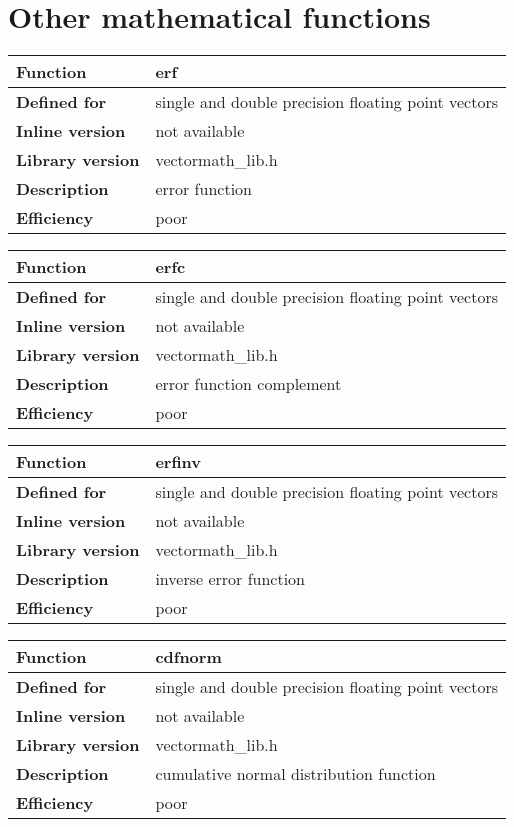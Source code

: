 \documentclass[vcl_manual.tex]{subfiles}
\begin{document}
\section{Other mathematical functions}\label{OtherMathematicalFunctions}

\begin{tabular}{|p{30mm}|p{120mm}|}
\hline
\bfseries Function & erf \\ \hline
\bfseries Defined for & single and double precision floating point vectors \\ \hline
\bfseries Inline version & not available \\ \hline
\bfseries Library version & vectormath\_lib.h \\ \hline
\bfseries Description & error function \\ \hline
\bfseries Efficiency & poor \\ \hline
\end{tabular}


\begin{tabular}{|p{30mm}|p{120mm}|}
\hline
\bfseries Function & erfc \\ \hline
\bfseries Defined for & single and double precision floating point vectors \\ \hline
\bfseries Inline version & not available \\ \hline
\bfseries Library version & vectormath\_lib.h \\ \hline
\bfseries Description & error function complement \\ \hline
\bfseries Efficiency & poor \\ \hline
\end{tabular}


\begin{tabular}{|p{30mm}|p{120mm}|}
\hline
\bfseries Function & erfinv \\ \hline
\bfseries Defined for & single and double precision floating point vectors \\ \hline
\bfseries Inline version & not available \\ \hline
\bfseries Library version & vectormath\_lib.h \\ \hline
\bfseries Description & inverse error function \\ \hline
\bfseries Efficiency & poor \\ \hline
\end{tabular}


\begin{tabular}{|p{30mm}|p{120mm}|}
\hline
\bfseries Function & cdfnorm \\ \hline
\bfseries Defined for & single and double precision floating point vectors \\ \hline
\bfseries Inline version & not available \\ \hline
\bfseries Library version & vectormath\_lib.h \\ \hline
\bfseries Description & cumulative normal distribution function \\ \hline
\bfseries Efficiency & poor \\ \hline
\end{tabular}
\end{document}
